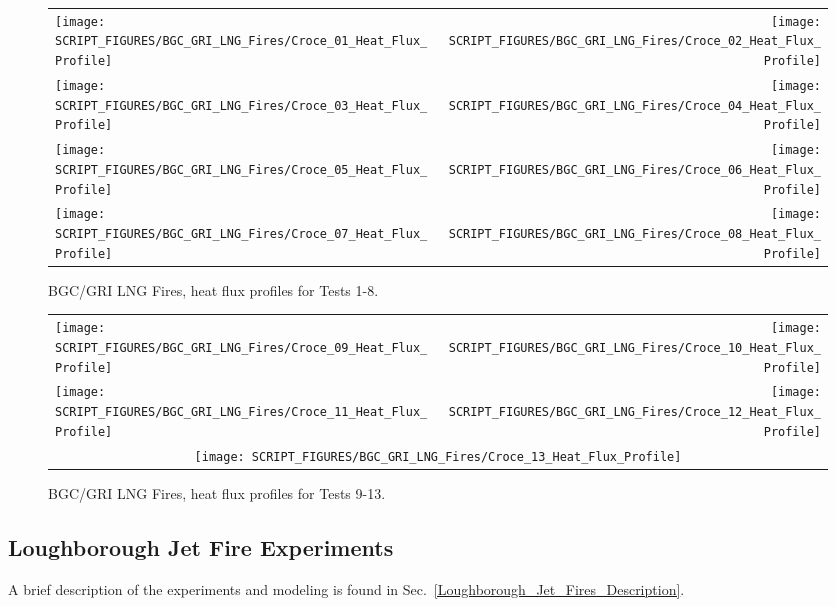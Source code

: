 \begin{figure}[p]
\begin{tabular*}{\textwidth}{l@{\extracolsep{\fill}}r}
\texttt{[image: SCRIPT\_FIGURES/BGC\_GRI\_LNG\_Fires/Croce\_01\_Heat\_Flux\_Profile]} &
\texttt{[image: SCRIPT\_FIGURES/BGC\_GRI\_LNG\_Fires/Croce\_02\_Heat\_Flux\_Profile]} \\
\texttt{[image: SCRIPT\_FIGURES/BGC\_GRI\_LNG\_Fires/Croce\_03\_Heat\_Flux\_Profile]} &
\texttt{[image: SCRIPT\_FIGURES/BGC\_GRI\_LNG\_Fires/Croce\_04\_Heat\_Flux\_Profile]} \\
\texttt{[image: SCRIPT\_FIGURES/BGC\_GRI\_LNG\_Fires/Croce\_05\_Heat\_Flux\_Profile]} &
\texttt{[image: SCRIPT\_FIGURES/BGC\_GRI\_LNG\_Fires/Croce\_06\_Heat\_Flux\_Profile]} \\
\texttt{[image: SCRIPT\_FIGURES/BGC\_GRI\_LNG\_Fires/Croce\_07\_Heat\_Flux\_Profile]} &
\texttt{[image: SCRIPT\_FIGURES/BGC\_GRI\_LNG\_Fires/Croce\_08\_Heat\_Flux\_Profile]}
\end{tabular*}
\caption[BGC/GRI LNG Fires, heat flux profiles for Tests 1-8]{BGC/GRI LNG Fires, heat flux profiles for Tests 1-8.}
\label{Croce_Heat_Flux_1}
\end{figure}

\begin{figure}[p]
\begin{tabular*}{\textwidth}{l@{\extracolsep{\fill}}r}
\texttt{[image: SCRIPT\_FIGURES/BGC\_GRI\_LNG\_Fires/Croce\_09\_Heat\_Flux\_Profile]} &
\texttt{[image: SCRIPT\_FIGURES/BGC\_GRI\_LNG\_Fires/Croce\_10\_Heat\_Flux\_Profile]} \\
\texttt{[image: SCRIPT\_FIGURES/BGC\_GRI\_LNG\_Fires/Croce\_11\_Heat\_Flux\_Profile]} &
\texttt{[image: SCRIPT\_FIGURES/BGC\_GRI\_LNG\_Fires/Croce\_12\_Heat\_Flux\_Profile]} \\
\multicolumn{2}{c}{\texttt{[image: SCRIPT\_FIGURES/BGC\_GRI\_LNG\_Fires/Croce\_13\_Heat\_Flux\_Profile]} }
\end{tabular*}
\caption[BGC/GRI LNG Fires, heat flux profiles for Tests 9-13]{BGC/GRI LNG Fires, heat flux profiles for Tests 9-13.}
\label{Croce_Heat_Flux_2}
\end{figure}


\clearpage

\subsection{Loughborough Jet Fire Experiments}
\label{Loughborough_Jet_Fires_Heat_Flux}

A brief description of the experiments and modeling is found in Sec.~\ref{Loughborough_Jet_Fires_Description}.

